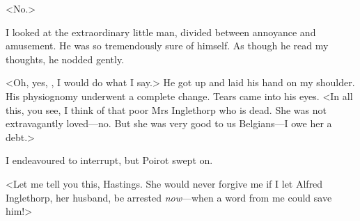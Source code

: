  <No.> 

 I looked at the extraordinary little man, divided between annoyance and amusement. He was so tremendously sure of himself. As though he read my thoughts, he nodded gently. 

 <Oh, yes, , I would do what I say.> He got up and laid his hand on my shoulder. His physiognomy underwent a complete change. Tears came into his eyes. <In all this, you see, I think of that poor Mrs Inglethorp who is dead. She was not extravagantly loved—no. But she was very good to us Belgians—I owe her a debt.> 

 I endeavoured to interrupt, but Poirot swept on. 

 <Let me tell you this, Hastings. She would never forgive me if I let Alfred Inglethorp, her husband, be arrested \emph{now}—when a word from me could save him!> 